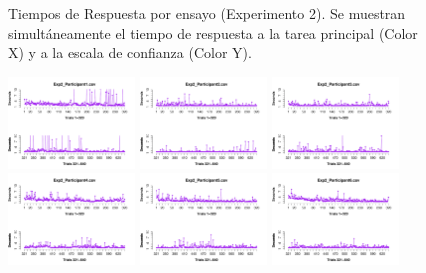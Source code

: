 \begin{figure}[th]
\caption[TRs_Exp2]{Tiempos de Respuesta por ensayo (Experimento 2). Se muestran simultáneamente el tiempo de respuesta a la tarea principal (Color X) y a la escala de confianza (Color Y).}
\label{fig:RTs_E2}
\end{figure}


\begin{figure}[th]
\centering
\includegraphics[width=0.30\textwidth]{Figures/RT1_Exp2_P1} \includegraphics[width=0.30\textwidth]{Figures/RT1_Exp2_P2} \includegraphics[width=0.30\textwidth]{Figures/RT1_Exp2_P3}
\includegraphics[width=0.30\textwidth]{Figures/RT1_Exp2_P4} \includegraphics[width=0.30\textwidth]{Figures/RT1_Exp2_P5} \includegraphics[width=0.30\textwidth]{Figures/RT1_Exp2_P6}

\end{figure}
